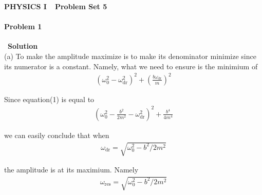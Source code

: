 \documentclass[12pt,a4paper]{article}
\begin{document}
\centerline{\Huge{{\textbf{PHYSICS I\ \ Problem Set 5}}}}
\vspace{0.5cm}
\paragraph{\large \textbf{Problem 1}}~{\textbf{Solution}}
\vspace{2mm}\\
\noindent (a) To make the amplitude maximize is to make its denominator minimize since its numerator is a constant. Namely, what we need to ensure is the minimium of
\begin{align}
	(\omega_0^2 - \omega_{\text{dr}}^2)^2 + \left( \frac{b\omega_{\text{dr}}}{m} \right)^2
\end{align}
\par Since equation(1) is equal to
\begin{align}
	\left( \omega_0^2 - \frac{b^2}{2m^2} - \omega_{\text{dr}}^2 \right)^2 + \frac{b^4}{4m^4}
\end{align}
\par we can easily conclude that when
\begin{align}
	\omega_{\text{dr}} = \sqrt{\omega_0^2 - b^2/2m^2}
\end{align}
\par the amplitude is at its maximium. Namely
\begin{align}
	\omega_{\text{res}} = \sqrt{\omega_0^2 - b^2/2m^2}
\end{align}
\end{document}
